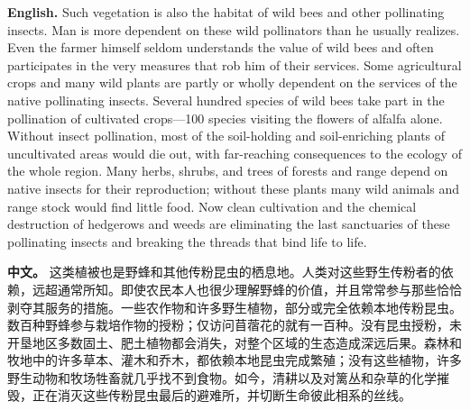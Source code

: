 \noindent\textbf{English.} Such vegetation is also the habitat of wild bees and other pollinating insects. Man is more dependent on these wild pollinators than he usually realizes. Even the farmer himself seldom understands the value of wild bees and often participates in the very measures that rob him of their services. Some agricultural crops and many wild plants are partly or wholly dependent on the services of the native pollinating insects. Several hundred species of wild bees take part in the pollination of cultivated crops---100 species visiting the flowers of alfalfa alone. Without insect pollination, most of the soil-holding and soil-enriching plants of uncultivated areas would die out, with far-reaching consequences to the ecology of the whole region. Many herbs, shrubs, and trees of forests and range depend on native insects for their reproduction; without these plants many wild animals and range stock would find little food. Now clean cultivation and the chemical destruction of hedgerows and weeds are eliminating the last sanctuaries of these pollinating insects and breaking the threads that bind life to life.
\par
\noindent\textbf{中文。} 这类植被也是野蜂和其他传粉昆虫的栖息地。人类对这些野生传粉者的依赖，远超通常所知。即使农民本人也很少理解野蜂的价值，并且常常参与那些恰恰剥夺其服务的措施。一些农作物和许多野生植物，部分或完全依赖本地传粉昆虫。数百种野蜂参与栽培作物的授粉；仅访问苜蓿花的就有一百种。没有昆虫授粉，未开垦地区多数固土、肥土植物都会消失，对整个区域的生态造成深远后果。森林和牧地中的许多草本、灌木和乔木，都依赖本地昆虫完成繁殖；没有这些植物，许多野生动物和牧场牲畜就几乎找不到食物。如今，清耕以及对篱丛和杂草的化学摧毁，正在消灭这些传粉昆虫最后的避难所，并切断生命彼此相系的丝线。
\par\medskip


